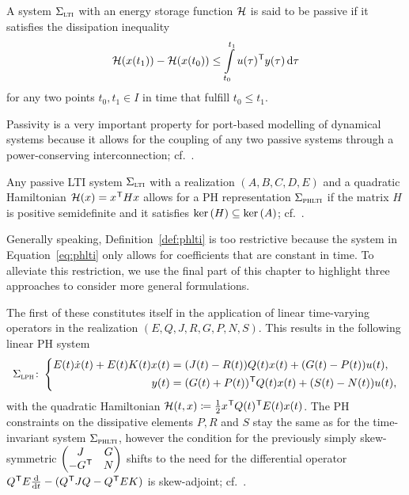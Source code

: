 \begin{definition}\label{def:passivity}
    A system $\Sigma_{\textnormal{\scshape lti}}$ with an energy storage function $\mathcal{H}$ is said to be passive if it satisfies the dissipation inequality
    \begin{equation*}
        \mathcal{H}(x(t_1)) - \mathcal{H}(x(t_0)) \leq \int\limits_{t_0}^{t_1} u(\tau)^{\mkern1mu \mathsf{T}} y(\tau) \mathop{}\!\mathrm{d} \tau
    \end{equation*}
    for any two points $t_0, t_1 \in I$ in time that fulfill $t_0 \leq t_1$.
\end{definition}

\begin{remark}
    Passivity is a very important property for port-based modelling of dynamical systems because it allows for the coupling of any two passive systems through a power-conserving interconnection; cf.~\cite[Section~6.4]{Mehrmann2023}.
\end{remark}

\begin{remark}
    Any passive \ac{LTI} system $\Sigma_{\textnormal{\scshape lti}}$ with a realization $(A, B, C, D, E)$ and a quadratic Hamiltonian $\mathcal{H}(x) = x^{\mkern1mu \mathsf{T}} H x$ allows for a \ac{PH} representation $\Sigma_{\textnormal{\scshape phlti}}$ if the matrix $H$ is positive semidefinite and it satisfies $\mathop{}\!\mathrm{ker}\left(H\right) \subseteq \mathop{}\!\mathrm{ker}\left(A\right)$; cf.~\cite[Theorem~7.1]{VanDerSchaft2014}.
\end{remark}

Generally speaking, Definition~\ref{def:phlti} is too restrictive because the system in Equation~\eqref{eq:phlti} only allows for coefficients that are constant in time.
To alleviate this restriction, we use the final part of this chapter to highlight three approaches to consider more general formulations.

\begin{remark}
    The first of these constitutes itself in the application of linear time-varying operators in the realization $(E, Q, J, R, G, P, N, S)$.
    This results in the following linear \ac{PH} system
    \begin{equation}\label{eq:lph}
        \Sigma_{\textnormal{\scshape lph}} \colon \left\lbrace
        \begin{aligned}
            E(t) \dot{x}(t) + E(t) K(t) x(t) &= (J(t) - R(t)) Q(t) x(t) + (G(t) - P(t)) u(t), \\
            y(t) &= (G(t) + P(t))^{\mkern1mu \mathsf{T}} Q(t) x(t) + (S(t) - N(t)) u(t),
        \end{aligned}
        \right.
    \end{equation}
    with the quadratic Hamiltonian $\mathcal{H}(t, x) \coloneqq \frac{1}{2} x^{\mkern1mu \mathsf{T}} Q(t)^{\mkern1mu \mathsf{T}} E(t) x(t)$.
    The \ac{PH} constraints on the dissipative elements $P, R$ and $S$ stay the same as for the time-invariant system $\Sigma_{\textnormal{\scshape phlti}}$, however the condition for the previously simply skew-symmetric $\begin{pmatrix}
        J & G \\
        -G^{\mkern1mu \mathsf{T}} & N
    \end{pmatrix}$ shifts to the need for the differential operator $Q^{\mkern1mu \mathsf{T}} E \frac{\mathop{}\!\mathrm{d}}{\mathop{}\!\mathrm{d} t} - (Q^{\mkern1mu \mathsf{T}} J Q - Q^{\mkern1mu \mathsf{T}} E K)$ is skew-adjoint; cf.~\cite[Definition~4.8]{Mehrmann2023}.
\end{remark}

